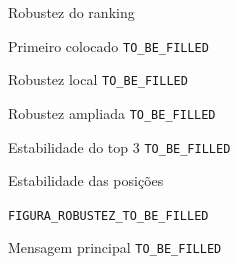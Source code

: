 \begin{frame}{Robustez do ranking}

    \begin{block}{Primeiro colocado}
        \texttt{TO\_BE\_FILLED}
    \end{block}

    \vspace{0.2cm}

    \begin{block}{Robustez local}
        \texttt{TO\_BE\_FILLED}
    \end{block}

    \vspace{0.2cm}

    \begin{block}{Robustez ampliada}
        \texttt{TO\_BE\_FILLED}
    \end{block}

    \vspace{0.2cm}

    \begin{block}{Estabilidade do top 3}
        \texttt{TO\_BE\_FILLED}
    \end{block}

\end{frame}



\begin{frame}{Estabilidade das posições}

    \begin{center}

        \texttt{FIGURA\_ROBUSTEZ\_TO\_BE\_FILLED}

    \end{center}

    \vspace{0.3cm}

    \begin{block}{Mensagem principal}
        \texttt{TO\_BE\_FILLED}
    \end{block}

\end{frame}



